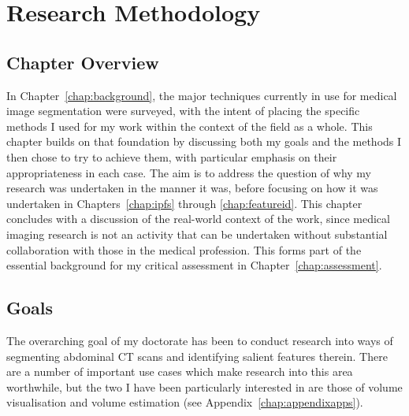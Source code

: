 \chapter{Research Methodology}
\label{chap:methodology}

\section{Chapter Overview}

In Chapter~\ref{chap:background}, the major techniques currently in use for medical image segmentation were surveyed, with the intent of placing the specific methods I used for my work within the context of the field as a whole. This chapter builds on that foundation by discussing both my goals and the methods I then chose to try to achieve them, with particular emphasis on their appropriateness in each case. The aim is to address the question of why my research was undertaken in the manner it was, before focusing on how it was undertaken in Chapters~\ref{chap:ipfs} through \ref{chap:featureid}. This chapter concludes with a discussion of the real-world context of the work, since medical imaging research is not an activity that can be undertaken without substantial collaboration with those in the medical profession. This forms part of the essential background for my critical assessment in Chapter~\ref{chap:assessment}.

\section{Goals}


The overarching goal of my doctorate has been to conduct research into ways of segmenting abdominal CT scans and identifying salient features therein. There are a number of important use cases which make research into this area worthwhile, but the two I have been particularly interested in are those of volume visualisation and volume estimation (see Appendix~\ref{chap:appendixapps}).

